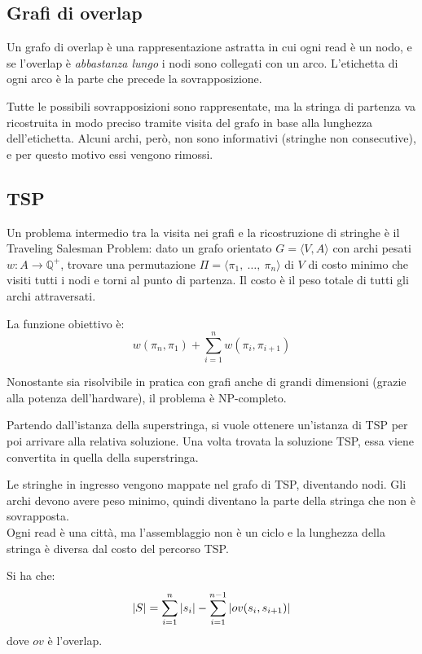 \subsection{Grafi di overlap}
Un grafo di overlap è una rappresentazione astratta in cui ogni read è un nodo, e se l'overlap è \textit{abbastanza lungo} i nodi sono collegati con un arco. L'etichetta di ogni arco è la parte che precede la sovrapposizione. 

Tutte le possibili sovrapposizioni sono rappresentate, ma la stringa di partenza va ricostruita in modo preciso tramite visita del grafo in base alla lunghezza dell'etichetta. Alcuni archi, però, non sono informativi (stringhe non consecutive), e per questo motivo essi vengono rimossi.



\subsection{TSP}
Un problema intermedio tra la visita nei grafi e la ricostruzione di stringhe è il Traveling Salesman Problem: dato un grafo orientato $G = \langle V, A \rangle$ con archi pesati $w : A \rightarrow \mathbb{Q}^+$, trovare una permutazione $\Pi = \langle \pi_1,\ \dots,\ \pi_n \rangle$ di $V$ di costo minimo che visiti tutti i nodi e torni al punto di partenza. Il costo è il peso totale di tutti gli archi attraversati.

La funzione obiettivo è:
\begin{equation*}
w(\pi_n, \pi_1) + \sum_{i=1}^{n} w(\pi_i, \pi_{i+1})
\end{equation*}

Nonostante sia risolvibile in pratica con grafi anche di grandi dimensioni (grazie alla potenza dell'hardware), il problema è NP-completo. 

Partendo dall'istanza della superstringa, si vuole ottenere un'istanza di TSP per poi arrivare alla relativa soluzione. Una volta trovata la soluzione TSP, essa viene convertita in quella della superstringa.

Le stringhe in ingresso vengono mappate nel grafo di TSP, diventando nodi. Gli archi devono avere peso minimo, quindi diventano la parte della stringa che non è sovrapposta. \\
Ogni read è una città, ma l'assemblaggio non è un ciclo e la lunghezza della stringa è diversa dal costo del percorso TSP. 

Si ha che:
\begin{equation*}
\left|S\right| = \sum_{i=1}^{n} |s_i| - \sum_{i=1}^{n-1} |ov(s_i, s_{i+1})|
\end{equation*}
dove $ov$ è l'overlap.

